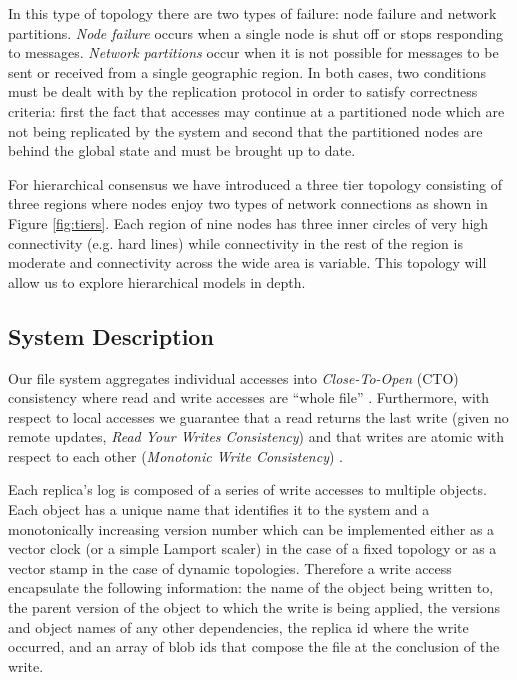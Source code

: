 \documentclass{article}
\begin{document}
In this type of topology there are two types of failure: node failure and network partitions. \textit{Node failure} occurs when a single node is shut off or stops responding to messages. \textit{Network partitions} occur when it is not possible for messages to be sent or received from a single geographic region. In both cases, two conditions must be dealt with by the replication protocol in order to satisfy correctness criteria: first the fact that accesses may continue at a partitioned node which are not being replicated by the system and second that the partitioned nodes are behind the global state and must be brought up to date.

For hierarchical consensus we have introduced a three tier topology consisting of three regions where nodes enjoy two types of network connections as shown in Figure \ref{fig:tiers}. Each region of nine nodes has three inner circles of very high connectivity (e.g. hard lines) while connectivity in the rest of the region is moderate and connectivity across the wide area is variable. This topology will allow us to explore hierarchical models in depth.

\subsection{System Description}

Our file system aggregates individual accesses into \textit{Close-To-Open} (CTO) consistency where read and write accesses are ``whole file'' \cite{muthitacharoen_low-bandwidth_2001}. Furthermore, with respect to local accesses we guarantee that a read returns the last write (given no remote updates, \textit{Read Your Writes Consistency}) and that writes are atomic with respect to each other (\textit{Monotonic Write Consistency}) \cite{bermbach_consistency_2013}.

Each replica's log is composed of a series of write accesses to multiple objects. Each object has a unique name that identifies it to the system and a monotonically increasing version number which can be implemented either as a vector clock \cite{parker_detection_1983} (or a simple Lamport scaler) in the case of a fixed topology or as a vector stamp \cite{almeida_version_2002} in the case of dynamic topologies. Therefore a write access encapsulate the following information: the name of the object being written to, the parent version of the object to which the write is being applied, the versions and object names of any other dependencies, the replica id where the write occurred, and an array of blob ids that compose the file at the conclusion of the write.
\end{document}
